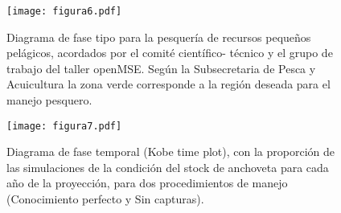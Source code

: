 
\begin{figure}[H]
    \centering
    \texttt{[image: figura6.pdf]}
    \caption{Diagrama de fase tipo para la pesquería de recursos pequeños pelágicos, acordados por el comité científico- técnico y el grupo de trabajo del taller openMSE. Según la Subsecretaria de Pesca y Acuicultura la zona verde corresponde a la región deseada para el manejo pesquero.}
    \label{fig:figure6}
\end{figure}

\begin{figure}[H]
    \centering
    \texttt{[image: figura7.pdf]}
    \caption{Diagrama de fase temporal (Kobe time plot), con la proporción de las simulaciones de la condición del stock de anchoveta para cada año de la proyección, para dos procedimientos de manejo (Conocimiento perfecto y Sin capturas).}
    \label{fig:figure7}
\end{figure}